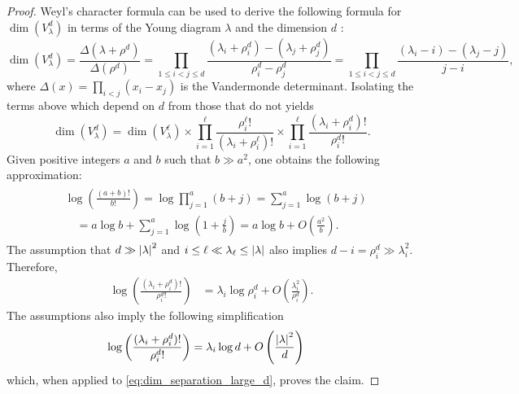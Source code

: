 \documentclass[notitlepage, 10pt]{article}
\begin{document}
\begin{proof}
    Weyl's character formula can be used to derive the following formula for $\dim(V_{\lambda}^{d})$ in terms of the Young diagram $\lambda$ and the dimension $d$ \cite{itzykson1966unitary}:
    \begin{equation}
        \dim(V_{\lambda}^{d}) = \frac{\Delta(\lambda + \rho^d)}{\Delta(\rho^d)} = \prod_{1 \leq i<j\leq d} \frac{(\lambda_i+\rho^d_i)-(\lambda_j+\rho^d_j)}{\rho^d_i - \rho^d_j} = \prod_{1 \leq i<j\leq d} \frac{(\lambda_i-i)-(\lambda_j-j)}{j-i},
    \end{equation}
    where $\Delta(x) = \prod_{i < j}(x_i-x_j)$ is the Vandermonde determinant.
    Isolating the terms above which depend on $d$ from those that do not yields
    \begin{equation}
        \label{eq:dim_separation_large_d}
        \dim(V_{\lambda}^{d}) = \dim(V_{\lambda}^{\ell}) \times \prod_{i=1}^{\ell}\frac{\rho^{\ell}_{i}!}{(\lambda_i + \rho^{\ell}_{i}) !} \times \prod_{i=1}^{\ell} \frac{(\lambda_i+\rho^{d}_i)!}{\rho^{d}_i!}.
    \end{equation}
    Given positive integers $a$ and $b$ such that $b \gg a^2$, one obtains the following approximation:
    \begin{align}
        \begin{split}
            &\log\left(\frac{(a+b)!}{b!}\right) 
            = \log \prod_{j=1}^{a} (b+j)
            = \sum_{j=1}^{a} \log (b+j) \\
            &\quad= a \log b + \sum_{j=1}^{a} \log \left(1+\frac{j}{b}\right)
            = a \log b + O\left(\frac{a^2}{b}\right).
        \end{split}
    \end{align}
    The assumption that $d \gg \left|\lambda\right|^2$ and $i \leq \ell \ll \lambda_{\ell} \leq \left|\lambda\right|$ also implies $d - i = \rho^{d}_i \gg \lambda_i^2$.
    Therefore,
    \begin{align}
        \log\left(\frac{(\lambda_i+\rho^{d}_i)!}{\rho^{d}_i!}\right) 
        &= \lambda_i\log\rho^{d}_i + O\left(\frac{\lambda_i^2}{\rho^{d}_i}\right).
    \end{align}
    The assumptions also imply the following simplification
    \begin{align}
        \log\left(\frac{(\lambda_i+\rho^{d}_i)!}{\rho^{d}_i!}\right) 
        &= \lambda_i\log d + O\left(\frac{\left|\lambda\right|^2}{d}\right)
    \end{align}
    which, when applied to \cref{eq:dim_separation_large_d}, proves the claim.
\end{proof}
\end{document}
